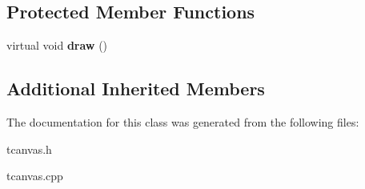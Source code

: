 \subsection*{Protected Member Functions}
\begin{DoxyCompactItemize}
\item 
\hypertarget{class_tetris_1_1_t_canvas_ad98121011f25b9cabaa78acbc71155d0}{virtual void {\bfseries draw} ()}\label{class_tetris_1_1_t_canvas_ad98121011f25b9cabaa78acbc71155d0}

\end{DoxyCompactItemize}
\subsection*{Additional Inherited Members}


The documentation for this class was generated from the following files\-:\begin{DoxyCompactItemize}
\item 
tcanvas.\-h\item 
tcanvas.\-cpp\end{DoxyCompactItemize}
